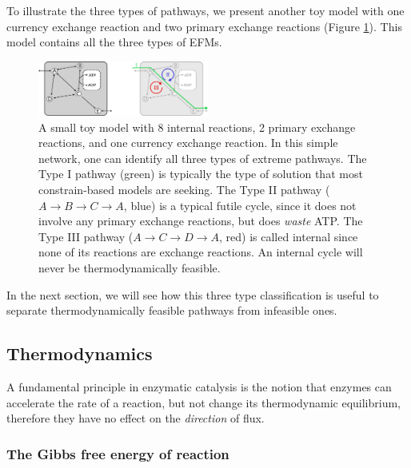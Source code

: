 \documentclass[10pt,a4paper]{article}
\begin{document}
To illustrate the three types of pathways, we present another toy model with one currency exchange reaction and two primary exchange reactions (Figure \ref{fig:toy2}). This model contains all the three types of EFMs.
\begin{figure}[ht!]
	\begin{center}
	\includegraphics[width=0.5\textwidth]{toy2}
	\caption{A small toy model with 8 internal reactions, 2 primary exchange reactions, and one currency exchange reaction. In this simple network, one can identify all three types of extreme pathways. The Type I pathway (green) is typically the type of solution that most constrain-based models are seeking. The Type II pathway ($A \rightarrow B \rightarrow C \rightarrow A$, blue) is a typical futile cycle, since it does not involve any primary exchange reactions, but does \emph{waste} ATP. The Type III pathway ($A \rightarrow C \rightarrow D \rightarrow A$, red) is called internal since none of its reactions are exchange reactions. An internal cycle will never be thermodynamically feasible.
	}\label{fig:toy2}
	\end{center}
\end{figure}

In the next section, we will see how this three type classification is useful to separate thermodynamically feasible pathways from infeasible ones.

\subsection{Thermodynamics}\label{sec:thermodynamics}
A fundamental principle in enzymatic catalysis is the notion that enzymes can accelerate the rate of a reaction, but not change its thermodynamic equilibrium, therefore they have no effect on the \textit{direction} of flux.

\subsubsection{The Gibbs free energy of reaction}
\end{document}
